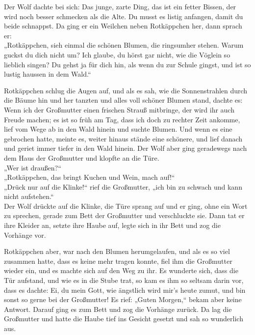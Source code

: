 \documentclass[12pt,a4paper]{article}
\begin{document}
Der Wolf dachte bei sich: Das junge, zarte Ding, das ist ein fetter Bissen, der wird noch besser schmecken als die Alte. Du musst es listig anfangen, damit du beide schnappst. Da ging er ein Weilchen neben Rotkäppchen her, dann sprach er:\\

„Rotkäppchen, sieh einmal die schönen Blumen, die ringsumher stehen. Warum guckst du dich nicht um? Ich glaube, du hörst gar nicht, wie die Vöglein so lieblich singen? Du gehst ja für dich hin, als wenn du zur Schule gingst, und ist so lustig haussen in dem Wald.“\par

Rotkäppchen schlug die Augen auf, und als es sah, wie die Sonnenstrahlen durch die Bäume hin und her tanzten und alles voll schöner Blumen stand, dachte es: Wenn ich der Großmutter einen frischen Strauß mitbringe, der wird ihr auch Freude machen; es ist so früh am Tag, dass ich doch zu rechter Zeit ankomme, lief vom Wege ab in den Wald hinein und suchte Blumen. Und wenn es eine gebrochen hatte, meinte es, weiter hinaus stände eine schönere, und lief danach und geriet immer tiefer in den Wald hinein. Der Wolf aber ging geradewegs nach dem Haus der Großmutter und klopfte an die Türe.\\

„Wer ist draußen?“\\

„Rotkäppchen, das bringt Kuchen und Wein, mach auf!“\\

„Drück nur auf die Klinke!“ rief die Großmutter, „ich bin zu schwach und kann nicht aufstehen.“\\

Der Wolf drückte auf die Klinke, die Türe sprang auf und er ging, ohne ein Wort zu sprechen, gerade zum Bett der Großmutter und verschluckte sie. Dann tat er ihre Kleider an, setzte ihre Haube auf, legte sich in ihr Bett und zog die Vorhänge vor. \par

Rotkäppchen aber, war nach den Blumen herumgelaufen, und als es so viel zusammen hatte, dass es keine mehr tragen konnte, fiel ihm die Großmutter wieder ein, und es machte sich auf den Weg zu ihr. Es wunderte sich, dass die Tür aufstand, und wie es in die Stube trat, so kam es ihm so seltsam darin vor, dass es dachte: Ei, du mein Gott, wie ängstlich wird mir's heute zumut, und bin sonst so gerne bei der Großmutter! Es rief: „Guten Morgen,“ bekam aber keine Antwort. Darauf ging es zum Bett und zog die Vorhänge zurück. Da lag die Großmutter und hatte die Haube tief ins Gesicht gesetzt und sah so wunderlich aus.\\
\end{document}
